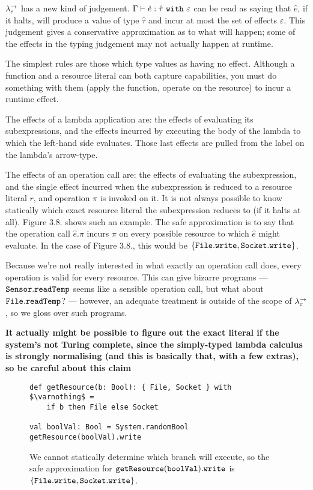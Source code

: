 \noindent
$\lambda^{\rightarrow}_{\varepsilon}$ has a new kind of judgement. $\Gamma \vdash \hat e: \hat \tau~\mathtt{with}~ \varepsilon$ can be read as saying that $\hat e$, if it halts, will produce a value of type $\hat \tau$ and incur at most the set of effects $\varepsilon$. This judgement gives a conservative approximation as to what will happen; some of the effects in the typing judgement may not actually happen at runtime.

The simplest rules are those which type values as having no effect. Although a function and a resource literal can both capture capabilities, you must do something with them (apply the function, operate on the resource) to incur a runtime effect.

The effects of a lambda application are: the effects of evaluating its subexpressions, and the effects incurred by executing the body of the lambda to which the left-hand side evaluates. Those last effects are pulled from the label on the lambda's arrow-type.

The effects of an operation call are: the effects of evaluating the subexpression, and the single effect incurred when the subexpression is reduced to a resource literal $r$, and operation $\pi$ is invoked on it. It is not always possible to know statically which exact resource literal the subexpression reduces to (if it halts at all). Figure 3.8. shows such an example. The safe approximation is to say that the operation call $\hat e.\pi$ incurs $\pi$ on every possible resource to which $\hat e$ might evaluate. In the case of Figure 3.8., this would be $\mathtt{\{ File.write, Socket.write \}}$.

Because we're not really interested in what exactly an operation call does, every operation is valid for every resource. This can give bizarre programs --- $\mathtt{Sensor.readTemp}$ seems like a sensible operation call, but what about $\mathtt{File.readTemp}$? --- however, an adequate treatment is outside of the scope of $\lambda^{\rightarrow}_{\varepsilon}$, so we gloss over such programs.

\textbf{It actually might be possible to figure out the exact literal if the system's not Turing complete, since the simply-typed lambda calculus is strongly normalising (and this is basically that, with a few extras), so be careful about this claim} \\

\begin{figure}[h]

\begin{lstlisting}
def getResource(b: Bool): { File, Socket } with $\varnothing$ =
    if b then File else Socket
 
val boolVal: Bool = System.randomBool
getResource(boolVal).write

\end{lstlisting}
\vspace{-7pt}
\caption{We cannot statically determine which branch will execute, so the safe approximation for $\mathtt{getResource(boolVal).write}$ is $\{ \mathtt{File.write, Socket.write} \}$.}
\label{This is the label.}
\end{figure}

